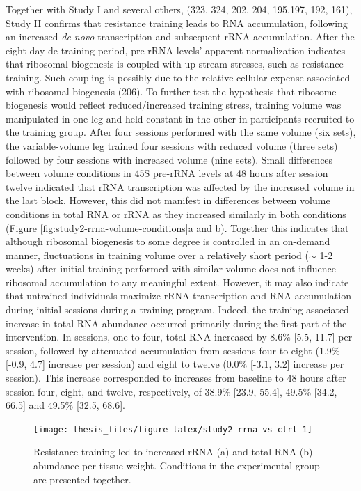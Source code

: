 \documentclass[twoside,10pt]{gihclass} %
\begin{document}
Together with Study I and several others,
(323, 324, 202, 204,
195,197, 192, 161),
Study II confirms that resistance training leads to RNA accumulation, following an increased \emph{de novo} transcription and subsequent rRNA accumulation. After the eight-day de-training period, pre-rRNA levels' apparent normalization indicates that ribosomal biogenesis is coupled with up-stream stresses, such as resistance training. Such coupling is possibly due to the relative cellular expense associated with ribosomal biogenesis (206).
To further test the hypothesis that ribosome biogenesis would reflect reduced/increased training stress, training volume was manipulated in one leg and held constant in the other in participants recruited to the training group.
After four sessions performed with the same volume (six sets), the variable-volume leg trained four sessions with reduced volume (three sets) followed by four sessions with increased volume (nine sets). Small differences between volume conditions in 45S pre-rRNA levels at 48 hours after session twelve indicated that rRNA transcription was affected by the increased volume in the last block. However, this did not manifest in differences between volume conditions in total RNA or rRNA as they increased similarly in both conditions (Figure \ref{fig:study2-rrna-volume-conditions}a and b). Together this indicates that although ribosomal biogenesis to some degree is controlled in an on-demand manner, fluctuations in training volume over a relatively short period (\(\sim\) 1-2 weeks) after initial training performed with similar volume does not influence ribosomal accumulation to any meaningful extent.
However, it may also indicate that untrained individuals maximize rRNA transcription and RNA accumulation during initial sessions during a training program.
Indeed, the training-associated increase in total RNA abundance occurred primarily during the first part of the intervention. In sessions, one to four, total RNA increased by 8.6\% {[}5.5, 11.7{]} per session, followed by attenuated accumulation from sessions four to eight (1.9\% {[}-0.9, 4.7{]} increase per session) and eight to twelve (0.0\% {[}-3.1, 3.2{]} increase per session). This increase corresponded to increases from baseline to 48 hours after session four, eight, and twelve, respectively, of 38.9\% {[}23.9, 55.4{]}, 49.5\% {[}34.2, 66.5{]} and 49.5\% {[}32.5, 68.6{]}.
\begin{figure}

{\centering \texttt{[image: thesis\_files/figure-latex/study2-rrna-vs-ctrl-1]} 

}

\caption[rRNA and total RNA changes in response to resistance training.]{Resistance training led to increased rRNA (a) and total RNA (b) abundance per tissue weight. Conditions in the experimental group are presented together.}\label{fig:study2-rrna-vs-ctrl}
\end{figure}
\end{document}
